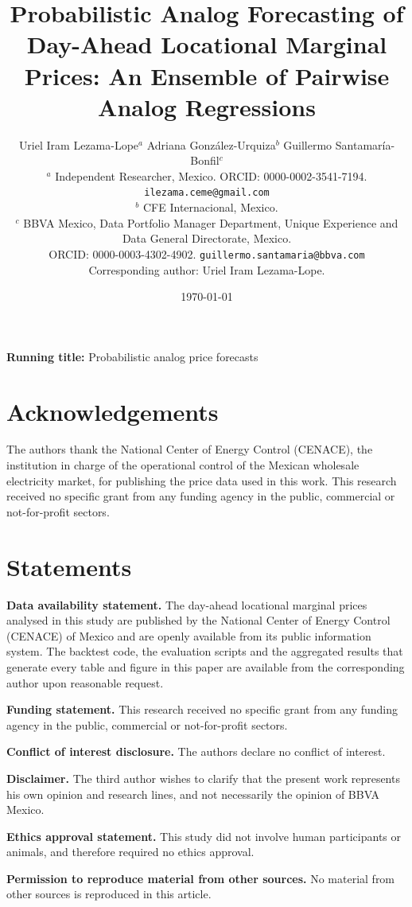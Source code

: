 \documentclass[12pt,a4paper]{article}
\title{\bfseries Probabilistic Analog Forecasting of Day-Ahead Locational
Marginal Prices: An Ensemble of Pairwise Analog Regressions}
\author{Uriel Iram Lezama-Lope$^{a}$ \quad
Adriana Gonz\'alez-Urquiza$^{b}$ \quad
Guillermo Santamar\'ia-Bonfil$^{c}$ \\[0.7em]
\normalsize $^{a}$ Independent Researcher, Mexico.
ORCID: 0000-0002-3541-7194.
\texttt{ilezama.ceme@gmail.com} \\
\normalsize $^{b}$ CFE Internacional, Mexico. \\
\normalsize $^{c}$ BBVA Mexico, Data Portfolio Manager Department, Unique
Experience and Data General Directorate, Mexico. \\
\normalsize \phantom{$^{c}$} ORCID: 0000-0003-4302-4902.
\texttt{guillermo.santamaria@bbva.com} \\[0.4em]
\normalsize Corresponding author: Uriel Iram Lezama-Lope.}
\date{\today}
\begin{document}
\maketitle

\noindent\textbf{Running title:} Probabilistic analog price forecasts

\section*{Acknowledgements}
The authors thank the National Center of Energy Control (CENACE), the
institution in charge of the operational control of the Mexican wholesale
electricity market, for publishing the price data used in this work. This
research received no specific grant from any funding agency in the public,
commercial or not-for-profit sectors.

\section*{Statements}

\noindent\textbf{Data availability statement.} The day-ahead locational
marginal prices analysed in this study are published by the National Center of
Energy Control (CENACE) of Mexico and are openly available from its public
information system. The backtest code, the evaluation scripts and the
aggregated results that generate every table and figure in this paper are
available from the corresponding author upon reasonable request.

\noindent\textbf{Funding statement.} This research received no specific grant
from any funding agency in the public, commercial or not-for-profit sectors.

\noindent\textbf{Conflict of interest disclosure.} The authors declare no
conflict of interest.

\noindent\textbf{Disclaimer.} The third author wishes to clarify that the
present work represents his own opinion and research lines, and not
necessarily the opinion of BBVA Mexico.

\noindent\textbf{Ethics approval statement.} This study did not involve human
participants or animals, and therefore required no ethics approval.

\noindent\textbf{Permission to reproduce material from other sources.} No
material from other sources is reproduced in this article.

\bigskip
\end{document}
